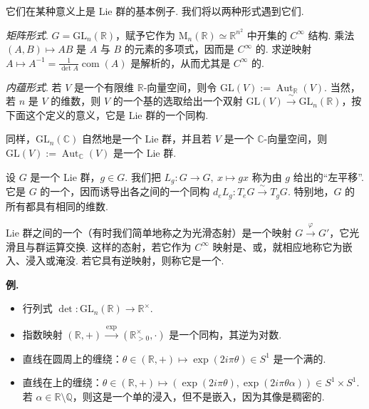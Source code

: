 \begin{numpara}[一般线性群]\label{np:lie-1-1-2}
它们在某种意义上是 Lie 群的基本例子. 我们将以两种形式遇到它们.

\emph{矩阵形式}. $G=\mathrm{GL}_n(\mathbb{R})$，赋予它作为 $\mathrm{M}_n(\mathbb{R})\simeq\mathbb{R}^{n^{2}}$ 中开集的 $C^{\infty}$ 结构. 乘法 $(A,B)\mapsto AB$ 是 $A$ 与 $B$ 的元素的多项式，因而是 $C^{\infty}$ 的. 求逆映射 $A\mapsto A^{-1}=\frac{1}{\det A}\operatorname{com}(A)$ 是解析的，从而尤其是 $C^{\infty}$ 的.

\emph{内蕴形式}. 若 $V$ 是一个有限维 $\mathbb{R}$-向量空间，则令 $\mathrm{GL}(V):=\operatorname{Aut}_{\mathbb{R}}(V)$. 当然，若 $n$ 是 $V$ 的维数，则 $V$ 的一个基的选取给出一个双射 $\mathrm{GL}(V)\xrightarrow{\ \sim\ }\mathrm{GL}_n(\mathbb{R})$，按下面这个定义的意义，它是 Lie 群的一个同构.

同样，$\mathrm{GL}_n(\mathbb{C})$ 自然地是一个 Lie 群，并且若 $V$ 是一个 $\mathbb{C}$-向量空间，则 $\mathrm{GL}(V):=\operatorname{Aut}_{\mathbb{C}}(V)$ 是一个 Lie 群.
\end{numpara}

\begin{remark}\label{rem:lie-1-1-3}
设 $G$ 是一个 Lie 群，$g\in G$. 我们把 $L_{g}:G\longrightarrow G,\ x\mapsto gx$ 称为由 $g$ 给出的``左平移''. 它是 $G$ 的一个，因而诱导出各之间的一个同构 $d_{e}L_{g}:T_{e}G\xrightarrow{\ \sim\ }T_{g}G$. 特别地，$G$ 的所有都具有相同的维数.
\end{remark}

\begin{definition}\label{def:lie-1-1-4}
Lie 群之间的一个（有时我们简单地称之为光滑态射）是一个映射 $G\xrightarrow{\ \varphi\ }G'$，它光滑且与群运算交换. 这样的态射，若它作为 $C^{\infty}$ 映射是、或，就相应地称它为嵌入、浸入或淹没. 若它具有逆映射，则称它是一个.
\end{definition}

\noindent\textbf{例.}
\begin{itemize}[label=--]
\item 行列式 $\det:\mathrm{GL}_n(\mathbb{R})\longrightarrow\mathbb{R}^{\times}$.
\item 指数映射 $(\mathbb{R},+)\xrightarrow{\ \exp\ }(\mathbb{R}_{>0}^{\times},\cdot)$ 是一个同构，其逆为对数.
\item 直线在圆周上的缠绕：$\theta\in(\mathbb{R},+)\mapsto\exp(2i\pi\theta)\in S^{1}$ 是一个满的.
\item 直线在上的缠绕：$\theta\in(\mathbb{R},+)\mapsto(\exp(2i\pi\theta),\exp(2i\pi\theta\alpha))\in S^{1}\times S^{1}$. 若 $\alpha\in\mathbb{R}\setminus\mathbb{Q}$，则这是一个单的浸入，但不是嵌入，因为其像是稠密的.
\end{itemize}

